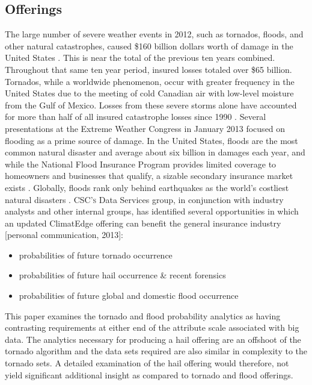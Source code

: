 \subsection{Offerings}
The large number of severe weather events in 2012, such as tornados, floods, and other natural catastrophes, caused \$160 billion dollars worth of damage in the United States \cite{stalder}. This is near the total of the previous ten years combined. Throughout that same ten year period, insured losses totaled over \$65 billion. Tornados, while a worldwide phenomenon, occur with greater frequency in the United States due to the meeting of cold Canadian air with low-level moisture from the Gulf of Mexico. Losses from these severe storms alone have accounted for more than half of all insured catastrophe losses since 1990 \cite{lloyds}. Several presentations at the Extreme Weather Congress in January 2013 focused on flooding as a prime source of damage. In the United States, floods are the most common natural disaster and average about six billion in damages each year, and while the National Flood Insurance Program provides limited coverage to homeowners and businesses that qualify, a sizable secondary insurance market exists \cite{hope}. Globally, floods rank only behind earthquakes as the world's costliest natural disasters \cite{li}. \textsc{CSC's} Data Services group, in conjunction with industry analysts and other internal groups, has identified several opportunities in which an updated ClimatEdge offering can benefit the general insurance industry [personal communication, 2013]:
\begin{itemize}
    \item probabilities of future tornado occurrence
    \item probabilities of future hail occurrence \& recent forensics
    \item probabilities of future global and domestic flood occurrence
\end{itemize}
This paper examines the tornado and flood probability analytics as having contrasting requirements at either end of the attribute scale associated with big data. The analytics necessary for producing a hail offering are an offshoot of the tornado algorithm and the data sets required are also similar in complexity to the tornado sets. A detailed examination of the hail offering would therefore, not yield significant additional insight as compared to tornado and flood offerings.